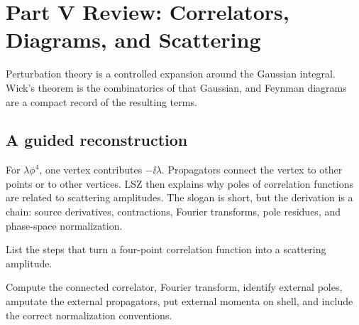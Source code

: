 
\chapter{Part V Review: Correlators, Diagrams, and Scattering}

Perturbation theory is a controlled expansion around the Gaussian integral.  Wick's theorem is the combinatorics of that Gaussian, and Feynman diagrams are a compact record of the resulting terms.

\section{A guided reconstruction}













For \(\lambda\phi^4\), one vertex contributes \(-\ii\lambda\).  Propagators connect the vertex to other points or to other vertices.  LSZ then explains why poles of correlation functions are related to scattering amplitudes.  The slogan is short, but the derivation is a chain: source derivatives, contractions, Fourier transforms, pole residues, and phase-space normalization.

\begin{exercise}
List the steps that turn a four-point correlation function into a scattering amplitude.
\begin{answer}
Compute the connected correlator, Fourier transform, identify external poles, amputate the external propagators, put external momenta on shell, and include the correct normalization conventions.
\end{answer}
\end{exercise}

